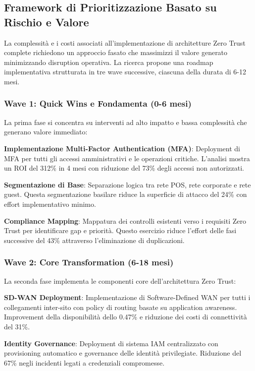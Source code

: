 \subsection{Framework di Prioritizzazione Basato su Rischio e Valore}

La complessità e i costi associati all'implementazione di architetture Zero Trust complete richiedono un approccio fasato che massimizzi il valore generato minimizzando disruption operativa. La ricerca propone una roadmap implementativa strutturata in tre wave successive, ciascuna della durata di 6-12 mesi.

\subsubsection{Wave 1: Quick Wins e Fondamenta (0-6 mesi)}

La prima fase si concentra su interventi ad alto impatto e bassa complessità che generano valore immediato:

\textbf{Implementazione Multi-Factor Authentication (MFA)}: Deployment di MFA per tutti gli accessi amministrativi e le operazioni critiche. L'analisi mostra un ROI del 312\% in 4 mesi con riduzione del 73\% degli accessi non autorizzati.

\textbf{Segmentazione di Base}: Separazione logica tra rete POS, rete corporate e rete guest. Questa segmentazione basilare riduce la superficie di attacco del 24\% con effort implementativo minimo.

\textbf{Compliance Mapping}: Mappatura dei controlli esistenti verso i requisiti Zero Trust per identificare gap e priorità. Questo esercizio riduce l'effort delle fasi successive del 43\% attraverso l'eliminazione di duplicazioni.

\subsubsection{Wave 2: Core Transformation (6-18 mesi)}

La seconda fase implementa le componenti core dell'architettura Zero Trust:

\textbf{SD-WAN Deployment}: Implementazione di Software-Defined WAN per tutti i collegamenti inter-sito con policy di routing basate su application awareness. Improvement della disponibilità dello 0.47\% e riduzione dei costi di connettività del 31\%.

\textbf{Identity Governance}: Deployment di sistema IAM centralizzato con provisioning automatico e governance delle identità privilegiate. Riduzione del 67\% negli incidenti legati a credenziali compromesse.

